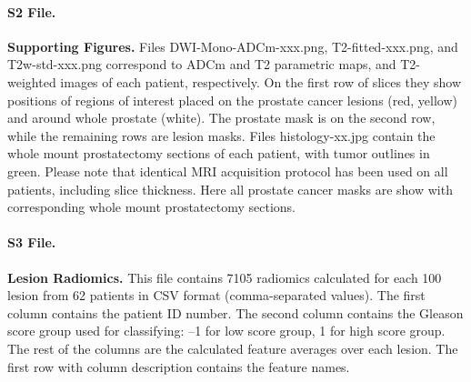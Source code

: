 \documentclass[10pt,letterpaper]{article}
\begin{document}
\paragraph*{S2 File.}
\label{S2_File}
{\bf Supporting Figures.}
Files DWI-Mono-ADCm-xxx.png, T2-fitted-xxx.png, and T2w-std-xxx.png correspond
to ADCm and T2 parametric maps, and T2-weighted images of each patient,
respectively. On the first row of slices they show positions of regions of
interest placed on the prostate cancer lesions (red, yellow) and around whole
prostate (white). The prostate mask is on the second row, while the remaining
rows are lesion masks. Files histology-xx.jpg contain the whole mount
prostatectomy sections of each patient, with tumor outlines in green. Please
note that identical MRI acquisition protocol has been used on all patients,
including slice thickness. Here all prostate cancer masks are show with
corresponding whole mount prostatectomy sections.

\paragraph*{S3 File.}
\label{S3_File}
{\bf Lesion Radiomics.}
This file contains 7105 radiomics calculated for each 100 lesion from 62
patients in CSV format (comma-separated values). The first column contains the
patient ID number. The second column contains the Gleason score group used for
classifying: --1 for low score group, 1 for high score group. The rest of the
columns are the calculated feature averages over each lesion. The first row with
column description contains the feature names. 
\end{document}

